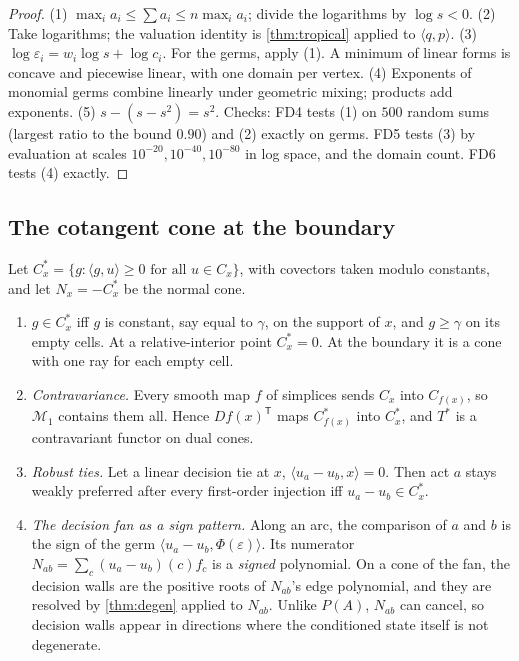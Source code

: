 \documentclass[11pt]{article}
\theoremstyle{definition}\newtheorem{definition}[theorem]{Definition}\newtheorem{remark}[theorem]{Remark}\newtheorem{example}[theorem]{Example}
\begin{document}
\begin{proof}
(1) $\max_ia_i\le\sum a_i\le n\max_ia_i$; divide the logarithms by $\log s<0$. (2) Take logarithms; the valuation identity is \cref{thm:tropical} applied
to $\langle q,p\rangle$. (3) $\log\varepsilon_i=w_i\log s+\log c_i$. For the germs, apply (1). A minimum of linear forms is concave and piecewise linear, with one
domain per vertex. (4) Exponents of monomial germs combine linearly under geometric mixing; products add exponents. (5)
$s-(s-s^2)=s^2$. Checks: FD4 tests (1) on $500$ random sums (largest ratio to the bound $0.90$) and (2) exactly on germs. FD5 tests (3) by
evaluation at scales $10^{-20},10^{-40},10^{-80}$ in log space, and the domain count. FD6 tests (4) exactly.
\end{proof}

\subsection{The cotangent cone at the boundary}
\begin{proposition}\label{prop:cotangent}
Let $C_x^*=\{g:\langle g,u\rangle\ge0\text{ for all }u\in C_x\}$, with covectors taken modulo constants, and let $N_x=-C_x^*$ be the normal cone.
\begin{enumerate}
\item[(1)] $g\in C_x^*$ iff $g$ is constant, say equal to $\gamma$, on the support of $x$, and $g\ge\gamma$ on its empty cells. At a relative-interior point
  $C_x^*=0$. At the boundary it is a cone with one ray for each empty cell.
\item[(2)] \emph{Contravariance.} Every smooth map $f$ of simplices sends $C_x$ into $C_{f(x)}$, so $\mathcal M_1$ contains them all. Hence
  $Df(x)^{\mathsf T}$ maps $C^*_{f(x)}$ into $C^*_x$, and $T^*$ is a contravariant functor on dual cones.
\item[(3)] \emph{Robust ties.} Let a linear decision tie at $x$, $\langle u_a-u_b,x\rangle=0$. Then act $a$ stays weakly preferred after every first-order injection
  iff $u_a-u_b\in C_x^*$.
\item[(4)] \emph{The decision fan as a sign pattern.} Along an arc, the comparison of $a$ and $b$ is the sign of the germ $\langle u_a-u_b,\Phi(\varepsilon)\rangle$.
  Its numerator $N_{ab}=\sum_c(u_a-u_b)(c)f_c$ is a \emph{signed} polynomial. On a cone of the fan, the decision walls are the positive roots of
  $N_{ab}$'s edge polynomial, and they are resolved by \cref{thm:degen} applied to $N_{ab}$. Unlike $P(A)$, $N_{ab}$ can cancel, so decision walls
  appear in directions where the conditioned state itself is not degenerate.
\end{enumerate}
\end{proposition}
\end{document}

